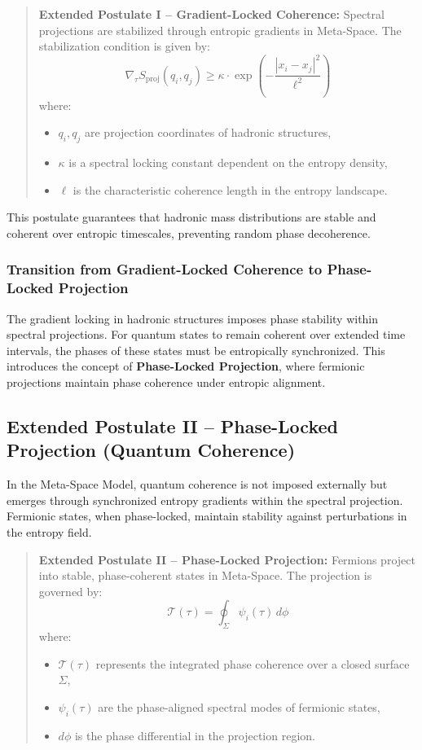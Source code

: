 \documentclass[10.5pt,a4paper]{article}
\begin{document}
\begin{quote}
\textbf{Extended Postulate I – Gradient-Locked Coherence:}  
Spectral projections are stabilized through entropic gradients in Meta-Space. The stabilization condition is given by:
\[
\nabla_\tau S_{\mathrm{proj}}(q_i, q_j) \geq \kappa \cdot \exp\left(-\frac{|x_i - x_j|^2}{\ell^2}\right)
\]
where:
\begin{itemize}
    \item \( q_i, q_j \) are projection coordinates of hadronic structures,
    \item \( \kappa \) is a spectral locking constant dependent on the entropy density,
    \item \( \ell \) is the characteristic coherence length in the entropy landscape.
\end{itemize}
\end{quote}

This postulate guarantees that hadronic mass distributions are stable and coherent over entropic timescales, 
preventing random phase decoherence.

\subsubsection*{Transition from Gradient-Locked Coherence to Phase-Locked Projection}

The gradient locking in hadronic structures imposes phase stability within spectral projections. For quantum 
states to remain coherent over extended time intervals, the phases of these states must be entropically synchronized.
This introduces the concept of \textbf{Phase-Locked Projection}, where fermionic projections maintain 
phase coherence under entropic alignment.

\subsection{Extended Postulate II – Phase-Locked Projection (Quantum Coherence)}

In the Meta-Space Model, quantum coherence is not imposed externally but emerges through synchronized 
entropy gradients within the spectral projection. Fermionic states, when phase-locked, maintain stability 
against perturbations in the entropy field.

\begin{quote}
\textbf{Extended Postulate II – Phase-Locked Projection:}  
Fermions project into stable, phase-coherent states in Meta-Space. The projection is governed by:
\[
\mathcal{T}(\tau) = \oint_\Sigma \psi_i(\tau) \, d\phi
\]
where:
\begin{itemize}
    \item \( \mathcal{T}(\tau) \) represents the integrated phase coherence over a closed surface \( \Sigma \),
    \item \( \psi_i(\tau) \) are the phase-aligned spectral modes of fermionic states,
    \item \( d\phi \) is the phase differential in the projection region.
\end{itemize}
\end{quote}
\end{document}
